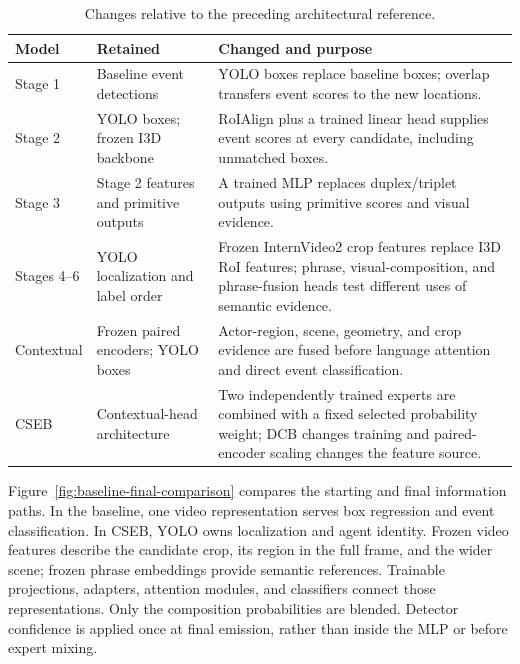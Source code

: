 \begin{table}[htbp]
\centering
\caption{Changes relative to the preceding architectural reference.}
\label{tab:modification-map}
\begin{singlespace}
\begin{tabularx}{\textwidth}{@{}p{}XX@{}}
\toprule
\textbf{Model} & \textbf{Retained} & \textbf{Changed and purpose}\\
\midrule
Stage 1 & Baseline event detections & YOLO boxes replace baseline boxes; overlap transfers event scores to the new locations.\\[5pt]
Stage 2 & YOLO boxes; frozen I3D backbone & RoIAlign plus a trained linear head supplies event scores at every candidate, including unmatched boxes.\\[5pt]
Stage 3 & Stage 2 features and primitive outputs & A trained MLP replaces duplex/triplet outputs using primitive scores and visual evidence.\\[5pt]
Stages 4--6 & YOLO localization and label order & Frozen InternVideo2 crop features replace I3D RoI features; phrase, visual-composition, and phrase-fusion heads test different uses of semantic evidence.\\[5pt]
Contextual & Frozen paired encoders; YOLO boxes & Actor-region, scene, geometry, and crop evidence are fused before language attention and direct event classification.\\[5pt]
CSEB & Contextual-head architecture & Two independently trained experts are combined with a fixed selected probability weight; DCB changes training and paired-encoder scaling changes the feature source.\\
\bottomrule
\end{tabularx}
\end{singlespace}
\end{table}

Figure~\ref{fig:baseline-final-comparison} compares the starting and final information paths. In the baseline, one video representation serves box regression and event classification. In CSEB, YOLO owns localization and agent identity. Frozen video features describe the candidate crop, its region in the full frame, and the wider scene; frozen phrase embeddings provide semantic references. Trainable projections, adapters, attention modules, and classifiers connect those representations. Only the composition probabilities are blended. Detector confidence is applied once at final emission, rather than inside the MLP or before expert mixing.

